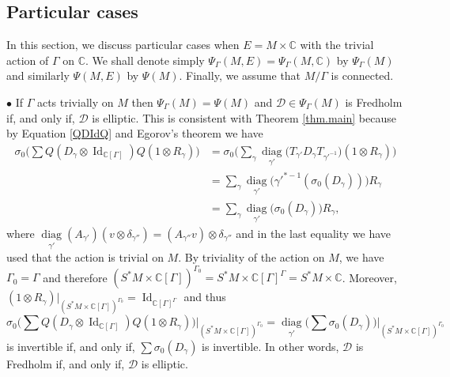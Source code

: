 \documentclass[11pt,a4paper]{amsart}
\newcommand{\C}{\mathbb C}
\newcommand{\maD}{\mathcal D}
\newcommand\<{\langle}
\renewcommand\>{\rangle}
\newcommand{\oid}{\operatorname{Id}}
\theoremstyle{definition}
\begin{document}
\subsection*{Particular cases}

In this section, we discuss particular cases when $E=M\times \C $ with the trivial action of $\Gamma$ on $\C$. We shall denote simply $\Psi_\Gamma(M,E)=\Psi_\Gamma(M,\C )$ by $\Psi_\Gamma(M)$  and similarly $\Psi(M,E)$ by $\Psi(M)$.   Finally, we assume that $M/\Gamma$ is connected. 

\medskip

$\bullet$ If $\Gamma$ acts trivially on $M$ then $\Psi_\Gamma(M)=\Psi(M)$
and $\maD \in \Psi_\Gamma(M)$ is Fredholm if, and only if, $\maD$ is elliptic.
This is consistent with Theorem \ref{thm.main} because by Equation \eqref{QDIdQ} and  
Egorov's theorem we have  
\begin{align*}
\sigma_0\Big(\sum Q(D_\gamma \otimes \oid_{\C[\Gamma]})Q (1 \otimes R_\gamma)\Big)
&=\sigma_0\bigg(\sum_\gamma \underset{\gamma'}{\operatorname{diag}}\big(T_{\gamma'} D_\gamma T_{\gamma'^{-1}}\big)  (1 \otimes R_\gamma)\bigg)\\
&=\sum_\gamma \underset{\gamma'}{\operatorname{diag}}\big( \gamma'^{*-1}(\sigma_0(D_\gamma))\big) R_\gamma\\
&=\sum_\gamma \underset{\gamma'}{\operatorname{diag}}\big( \sigma_0(D_\gamma)\big) R_\gamma,
\end{align*}
where $\underset{\gamma'}{\operatorname{diag}}(A_{\gamma'})(v \otimes \delta_{\gamma''})=(A_{\gamma''} v) \otimes \delta_{\gamma''}$
and in the last equality we have used that the action is trivial on $M$. 
By triviality of the action on $M$, we have $\Gamma_0=\Gamma$ and therefore 
$(S^*M \times \C[\Gamma])^{\Gamma_0}=S^*M \times \C[\Gamma]^\Gamma=S^*M \times \C$.
Moreover, $(1 \otimes R_\gamma) \vert_{ (S^*M \times \C[\Gamma])^{\Gamma_0}}= \oid_{\C[\Gamma]^\Gamma}$ and thus
$$\sigma_0\Big(\sum Q(D_\gamma \otimes \oid_{\C[\Gamma]})Q (1 \otimes R_\gamma)\Big)\vert_{ (S^*M \times \C[\Gamma])^{\Gamma_0}}
= \underset{\gamma'}{\operatorname{diag}}\Big( \sum \sigma_0(D_\gamma)\Big)\vert_{(S^*M \times \C[\Gamma])^{\Gamma_0}} $$
is invertible if, and only if, $ \sum \sigma_0(D_\gamma)$ is invertible.
In other words, $\maD$ is Fredholm if, and only if, $\maD$ is elliptic. 

\medskip
\end{document}
